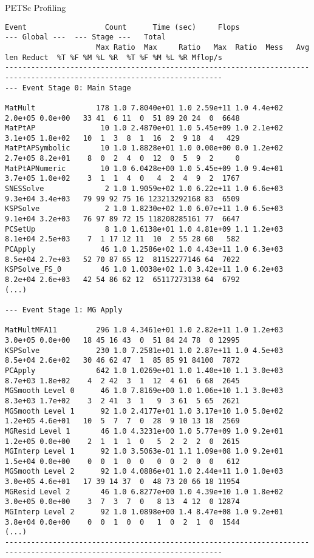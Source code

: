 \begin{frame}[fragile]{PETSc Profiling}

{ \tiny
\begin{verbatim}
Event                  Count      Time (sec)     Flops                             --- Global ---  --- Stage ---   Total
                     Max Ratio  Max     Ratio   Max  Ratio  Mess   Avg len Reduct  %T %F %M %L %R  %T %F %M %L %R Mflop/s
------------------------------------------------------------------------------------------------------------------------
--- Event Stage 0: Main Stage

MatMult              178 1.0 7.8040e+01 1.0 2.59e+11 1.0 4.4e+02 2.0e+05 0.0e+00   33 41  6 11  0  51 89 20 24  0  6648
MatPtAP               10 1.0 2.4870e+01 1.0 5.45e+09 1.0 2.1e+02 3.1e+05 1.8e+02   10  1  3  8  1  16  2  9 18  4   429
MatPtAPSymbolic       10 1.0 1.8828e+01 1.0 0.00e+00 0.0 1.2e+02 2.7e+05 8.2e+01    8  0  2  4  0  12  0  5  9  2     0
MatPtAPNumeric        10 1.0 6.0428e+00 1.0 5.45e+09 1.0 9.4e+01 3.7e+05 1.0e+02    3  1  1  4  0   4  2  4  9  2  1767
SNESSolve              2 1.0 1.9059e+02 1.0 6.22e+11 1.0 6.6e+03 9.3e+04 3.4e+03   79 99 92 75 16 123213292168 83  6509
KSPSolve               2 1.0 1.8230e+02 1.0 6.07e+11 1.0 6.5e+03 9.1e+04 3.2e+03   76 97 89 72 15 118208285161 77  6647
PCSetUp                8 1.0 1.6138e+01 1.0 4.81e+09 1.1 1.2e+03 8.1e+04 2.5e+03    7  1 17 12 11  10  2 55 28 60   582
PCApply               46 1.0 1.2586e+02 1.0 4.43e+11 1.0 6.3e+03 8.5e+04 2.7e+03   52 70 87 65 12  81152277146 64  7022
KSPSolve_FS_0         46 1.0 1.0038e+02 1.0 3.42e+11 1.0 6.2e+03 8.2e+04 2.6e+03   42 54 86 62 12  65117273138 64  6792
(...)

--- Event Stage 1: MG Apply

MatMultMFA11         296 1.0 4.3461e+01 1.0 2.82e+11 1.0 1.2e+03 3.0e+05 0.0e+00   18 45 16 43  0  51 84 24 78  0 12995
KSPSolve             230 1.0 7.2581e+01 1.0 2.87e+11 1.0 4.5e+03 8.5e+04 2.6e+02   30 46 62 47  1  85 85 91 84100  7872
PCApply              642 1.0 1.0269e+01 1.0 1.40e+10 1.1 3.0e+03 8.7e+03 1.8e+02    4  2 42  3  1  12  4 61  6 68  2645
MGSmooth Level 0      46 1.0 7.8169e+00 1.0 1.06e+10 1.1 3.0e+03 8.3e+03 1.7e+02    3  2 41  3  1   9  3 61  5 65  2621
MGSmooth Level 1      92 1.0 2.4177e+01 1.0 3.17e+10 1.0 5.0e+02 1.2e+05 4.6e+01   10  5  7  7  0  28  9 10 13 18  2569
MGResid Level 1       46 1.0 4.3231e+00 1.0 5.77e+09 1.0 9.2e+01 1.2e+05 0.0e+00    2  1  1  1  0   5  2  2  2  0  2615
MGInterp Level 1      92 1.0 3.5063e-01 1.1 1.09e+08 1.0 9.2e+01 1.5e+04 0.0e+00    0  0  1  0  0   0  0  2  0  0   612
MGSmooth Level 2      92 1.0 4.0886e+01 1.0 2.44e+11 1.0 1.0e+03 3.0e+05 4.6e+01   17 39 14 37  0  48 73 20 66 18 11954
MGResid Level 2       46 1.0 6.8277e+00 1.0 4.39e+10 1.0 1.8e+02 3.0e+05 0.0e+00    3  7  3  7  0   8 13  4 12  0 12874
MGInterp Level 2      92 1.0 1.0898e+00 1.4 8.47e+08 1.0 9.2e+01 3.8e+04 0.0e+00    0  0  1  0  0   1  0  2  1  0  1544
(...)
------------------------------------------------------------------------------------------------------------------------
\end{verbatim}
}
\end{frame}
